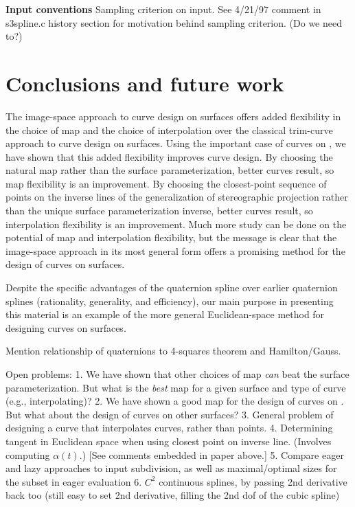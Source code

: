 {\bf Input conventions}
Sampling criterion on input.  %
See 4/21/97 comment in s3spline.c history section for motivation behind
sampling criterion. (Do we need to?)

\section{Conclusions and future work}

The image-space approach to curve design on surfaces offers
added flexibility in the choice of map and the choice of interpolation
over the classical trim-curve approach to curve design on surfaces.
Using the important case of curves on , 
we have shown that this added flexibility improves curve design.
By choosing the natural map rather than the surface parameterization,
better curves result, so map flexibility is an improvement.
By choosing the closest-point sequence of points on the inverse lines
of the generalization of stereographic projection
rather than the unique surface parameterization inverse,
better curves result, so interpolation flexibility is an improvement.
Much more study can be done on the potential of map and interpolation
flexibility, but the message is clear that the 
image-space approach in its most general form offers a promising
method for the design of curves on surfaces.

Despite the specific advantages of the quaternion spline
over earlier quaternion splines (rationality, generality, and efficiency), 
our main purpose in presenting this material
is an example of the more general Euclidean-space method for designing
curves on surfaces.


Mention relationship of quaternions to 4-squares theorem and Hamilton/Gauss.

Open problems: 
	1. We have shown that other choices of map {\em can} beat the surface
	parameterization.
	But what is the {\em best} map for a given surface and type of curve (e.g., interpolating)?
	2. We have shown a good map for the design of curves on .
	But what about the design of curves on other surfaces?
	3. General problem of designing a curve that interpolates curves, rather than points.
	4. Determining tangent in Euclidean space when using closest point on inverse line.
		(Involves computing $\alpha(t)$.)
		[See comments embedded in paper above.]
	5. Compare eager and lazy approaches to input subdivision,
	   as well as maximal/optimal sizes for the subset in eager evaluation
	6. $C^2$ continuous splines, by passing 2nd derivative back too
		(still easy to set 2nd derivative, filling the 2nd dof of the cubic spline)

